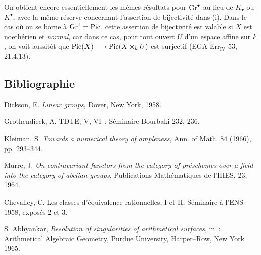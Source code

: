On
obtient encore essentiellement les mêmes résultats pour \(\Gr^\bullet\) au lieu de \(K_\bullet\) ou \(K^\bullet\), avec la même réserve concernant l'assertion de bijectivité dans (i). Dans le cas où on se borne à \(\Gr^1=\Pic\), cette assertion de bijectivité est valable si \(X\) est noethérien et \emph{normal}, car dans ce cas, pour tout ouvert \(U\) d'un espace affine sur \(k\), on voit aussitôt que \(\Pic(X)\longrightarrow \Pic(X\times_k U)\) est surjectif (EGA \(\mathrm{Err}_{\mathrm{IV}}\) 53, 21.4.13).

\subsection*{Bibliographie}
\begin{enumerate}[label={[\arabic*]}]
\item Dickson, E. \emph{Linear groups}, Dover, New York, 1958.
\item Grothendieck, A. TDTE, V, VI~; Séminaire Bourbaki 232, 236.
\item Kleiman, S. \emph{Towards a numerical theory of ampleness}, Ann. of Math. 84 (1966), pp. 293--344.
\item Murre, J. \emph{On contravariant functors from the category of préschemes over a field into the category of abelian groups}, Publications Mathématiques de l'IHES, 23, 1964.
\item Chevalley, C. Les classes d'équivalence rationnelles, I et II, Séminaire à l'ENS 1958, exposés 2 et 3.
\item S. Abhyankar, \emph{Resolution of singularities of arithmetical surfaces}, in~: Arithmetical Algebraic Geometry, Purdue University, Harper--Row, New York 1965.
\end{enumerate}

\providecommand{\Isom}{\operatorname{Isom}}
\providecommand{\Hom}{\operatorname{Hom}}
\providecommand{\Coker}{\operatorname{Coker}}
\providecommand{\Nil}{\operatorname{Nil}}
\providecommand{\im}{\operatorname{Im}}
\providecommand{\coker}{\operatorname{coker}}
\providecommand{\Supp}{\operatorname{Supp}}
\providecommand{\fppf}{\mathrm{fppf}}
\providecommand{\zar}{\mathrm{zar}}
\providecommand{\GL}{\operatorname{Gl}}
\providecommand{\Gr}{\operatorname{Gr}}
\providecommand{\Pic}{\operatorname{Pic}}
\providecommand{\Spec}{\operatorname{Spec}}
\providecommand{\V}{\operatorname{V}}
\providecommand{\Ass}{\operatorname{Ass}}

\newpage
